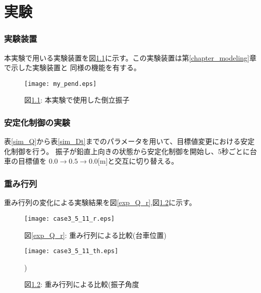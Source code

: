 \chapter{実験}

\subsection{実験装置}
本実験で用いる実験装置を図\ref{my_pend}に示す。この実験装置は第\ref{chapter_modeling}章で示した実験装置と
同様の機能を有する。

\begin{figure}[htbp]
    \begin{center}
        \texttt{[image: my\_pend.eps]}
        \caption{図\ref{my_pend}: 本実験で使用した倒立振子}
        \label{my_pend}
    \end{center}
\end{figure}


\subsection{安定化制御の実験}
表\ref{sim_Q}から表\ref{sim_Dt}までのパラメータを用いて、目標値変更における安定化制御を行う。
振子が鉛直上向きの状態から安定化制御を開始し、$5$秒ごとに台車の目標値を
$0.0 \to 0.5 \to 0.0$[m]と交互に切り替える。

\subsection{重み行列}
重み行列の変化による実験結果を図\ref{exp_Q_r},図\ref{exp_Q_th}に示す。

\begin{figure}[htbp]
    \begin{minipage}{0.5\hsize}
        \begin{center}
            \texttt{[image: case3\_5\_11\_r.eps]}
            \caption{図\ref{exp_Q_r}: 重み行列による比較(台車位置)}
            \label{exp_Q_r}
        \end{center}
    \end{minipage}
    \begin{minipage}{0.5\hsize}
        \begin{center}
            \texttt{[image: case3\_5\_11\_th.eps]}
            \caption{図\ref{exp_Q_th}: 重み行列による比較(振子角度})
            \label{exp_Q_th}
        \end{center}
    \end{minipage}
\end{figure}

